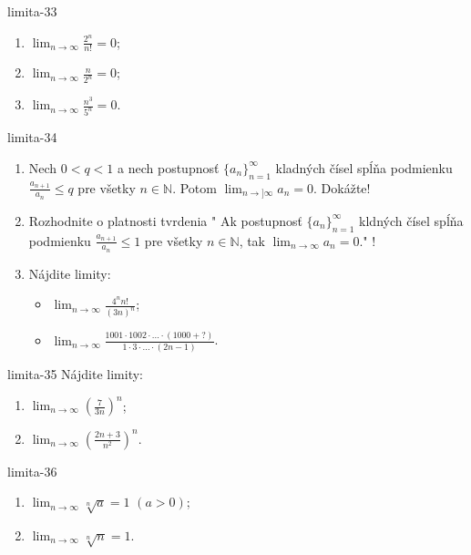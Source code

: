 \begin{defproblem}{limita-33}
\begin{enumerate}
\item $\lim_{n \rightarrow \infty} \frac{2^n}{n!}=0$;
\item $\lim_{n \rightarrow \infty} \frac{n}{2^n}=0$;
\item $\lim_{n \rightarrow \infty} \frac{n^3}{5^n}=0$.
\end{enumerate}
\end{defproblem}

\begin{defproblem}{limita-34}
\begin{enumerate}
\item Nech $0<q<1$ a nech postupnosť ${\{a_n\}}_{n=1}^\infty$ kladných čísel spĺňa podmienku $\frac{a_{n+1}}{a_{n}} \leq q$ pre všetky $n \in \mathbb{N}$. Potom $\lim_{n \rightarrow] \infty} a_n=0$. Dokážte!
\item Rozhodnite o platnosti tvrdenia " Ak postupnosť ${\{a_n\}}_{n=1}^\infty$ kldných čísel spĺňa podmienku $\frac{a_{n+1}}{a_{n}} \leq 1$ pre všetky $n \in \mathbb{N}$, tak $\lim_{n \rightarrow \infty} a_n=0$." !
\item Nájdite limity:
\begin{itemize}
\item $\lim_{n \rightarrow \infty} \frac{4^n n!}{(3n)^n}$;
\item $\lim_{n \rightarrow \infty} \frac{1001 \cdot 1002 \cdot ... \cdot (1000+?)}{1 \cdot 3 \cdot ... \cdot (2n-1)}$.
\end{itemize}
\end{enumerate}
\end{defproblem}

\begin{defproblem}{limita-35}
Nájdite limity:
\begin{enumerate}
\item $\lim_{n \rightarrow \infty} (\frac{7}{3n})^n$;
\item $\lim_{n \rightarrow \infty} (\frac{2n+3}{n^2})^n$.
\end{enumerate}
\end{defproblem}

\begin{defproblem}{limita-36}
\begin{enumerate}
\item $\lim_{n \rightarrow \infty} \sqrt[n]{a}=1$  $(a>0)$;
\item $\lim_{n \rightarrow \infty} \sqrt[n]{n}=1$.
\end{enumerate}
\end{defproblem}

